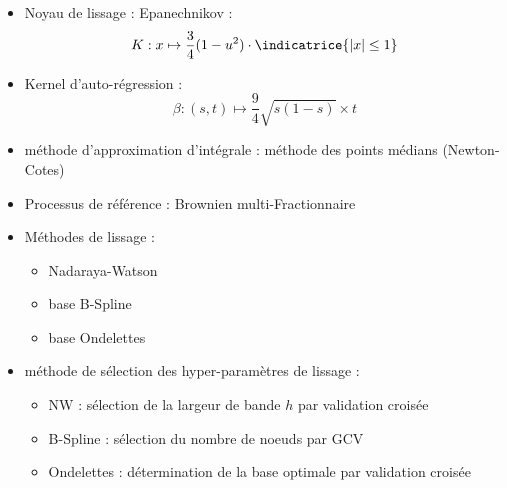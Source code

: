 
\begin{itemize}
	\item Noyau de lissage : Epanechnikov :
	      $$K : x \mapsto \frac 3 4 (1 - u^2)\cdot \indicatrice{|x| \leq 1}$$
	\item Kernel d'auto-régression :
	      $$\beta : (s,t) \mapsto \frac 9 4 \sqrt{s(1-s)} \times t$$
	\item méthode d'approximation d'intégrale : méthode des points médians (Newton-Cotes)
	\item Processus de référence : Brownien multi-Fractionnaire
	      \citationrequise
	\item Méthodes de lissage :
	      \begin{itemize}
		      \item Nadaraya-Watson
		      \item base B-Spline
		      \item base Ondelettes
	      \end{itemize}
	\item méthode de sélection des hyper-paramètres de lissage :
	      \begin{itemize}
		      \item NW : sélection de la largeur de bande $h$ par validation croisée
		      \item B-Spline : sélection du nombre de noeuds par GCV
		      \item Ondelettes : détermination de la base optimale par validation croisée
	      \end{itemize}
\end{itemize}

